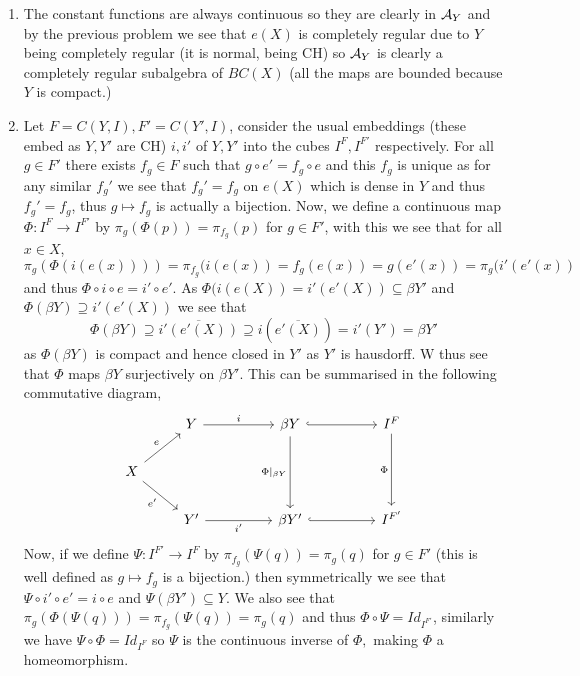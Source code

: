 \documentclass[12pt,a4paper]{article}
\begin{document}
\begin{solution}
\begin{enumerate}[label=\alph*.]
    \item The constant functions are always continuous so they are clearly in $\mathcal{A}_Y$ and by the previous problem we see that $e(X)$ is completely regular due to $Y$ being completely regular (it is normal, being CH) so $\mathcal{A}_Y$ is clearly a completely regular subalgebra of $BC(X)$ (all the maps are bounded because $Y$ is compact.) 
    \item Let $F=C(Y,I),F'=C(Y',I)$, consider the usual embeddings (these embed as $Y,Y'$ are CH) $i,i'$ of $Y,Y'$ into the cubes $I^F,I^{F'}$ respectively.
        For all $g\in F'$ there exists $f_g\in F$ such that $g\circ e'=f_g\circ e$ and this $f_g$ is unique as for any similar $f_g'$ we see that $f_g'=f_g$ on $e(X)$ which is dense in $Y$ and thus $f_g'=f_g$, thus $g\mapsto f_g$ is actually a bijection.  
        Now, we define a continuous map $\Phi:I^F\to I^{F'}$ by $\pi_g(\Phi(p))=\pi_{f_g}(p)$ for $g\in F'$, with this we see that for all $x\in X$, 
        \[
            \pi_g(\Phi(i(e(x))))=\pi_{f_g}(i(e(x))=f_g(e(x))=g(e'(x))=\pi_g(i'(e'(x))
        \]
        and thus $\Phi\circ i\circ e=i'\circ e'.$ 
        As $\Phi(i(e(X))=i'(e'(X)) \subseteq\beta Y'$ and $\Phi(\beta Y)\supseteq i'(e'(X))$ we see that 
        \[
        \Phi(\beta Y) \supseteq \overline{i'(e'(X))}\supseteq i(\overline{e'(X)})=i'(Y')=\beta Y'
        \] 
        as $\Phi(\beta Y)$ is compact and hence closed in $Y'$ as $Y'$ is hausdorff. 
        W thus see that $\Phi$ maps $\beta Y$ surjectively on $\beta Y'$. 
        This can be summarised in the following commutative diagram, 
       \[
        \begin{tikzcd}
	    & Y && {\beta Y} && {I^F} \\
	    X \\
	    & {Y'} && {\beta Y'} && {I^{F'}}
	    \arrow["i", from=1-2, to=1-4]
	    \arrow[hook, from=1-4, to=1-6]
	    \arrow["{\Phi|_{\beta Y}}"', from=1-4, to=3-4]
	    \arrow["\Phi"', from=1-6, to=3-6]
    	\arrow["e", from=2-1, to=1-2]
    	\arrow["{e'}"', from=2-1, to=3-2]
    	\arrow["{i'}"', from=3-2, to=3-4]
    	\arrow[hook, from=3-4, to=3-6]
        \end{tikzcd}
        \]
        Now, if we define $\Psi:I^{F'}\to I^F$ by $\pi_{f_g}(\Psi(q))=\pi_g(q)$ for $g\in F'$ (this is well defined as $g\mapsto f_g$ is a bijection.) then symmetrically we see that $\Psi\circ i'\circ e'=i\circ e$ and $\Psi(\beta Y') \subseteq Y$. 
        We also see that $\pi_g(\Phi(\Psi(q)))=\pi_{f_g}(\Psi(q))=\pi_g(q)$ and thus $\Phi\circ\Psi=Id_{I^{F'}}$, similarly we have $\Psi\circ\Phi=Id_{I^{F}}$ so $\Psi$ is the continuous inverse of $\Phi,$ making $\Phi$ a homeomorphism. 

\end{enumerate}
\end{solution}
\end{document}
